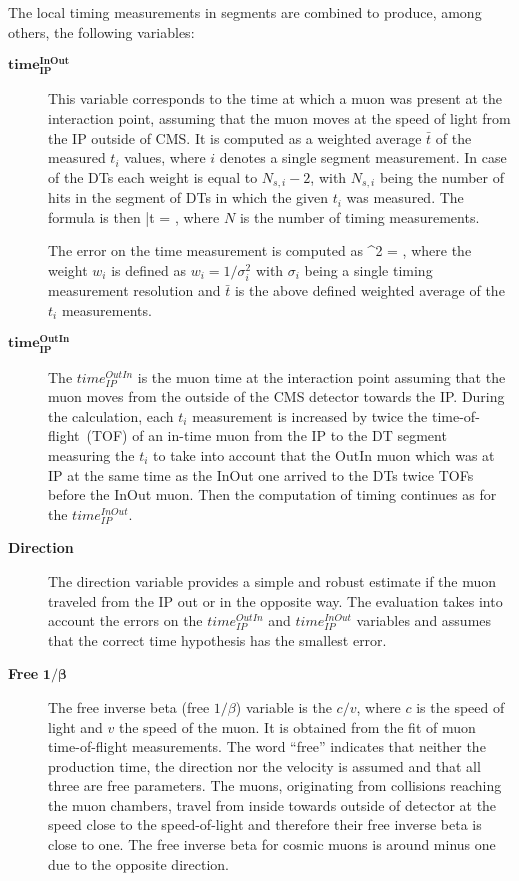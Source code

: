 The local timing measurements in segments are combined to produce, among others, the following variables: 

\begin{description}
\item [$\mathbf{time_{IP}^{InOut}}$]
This variable corresponds to the time at which a muon was present at the interaction point, assuming that the muon moves at the speed of light from the IP outside of CMS. It is computed as a weighted average $\bar{t}$ of the measured $t_{i}$ values, where $i$ denotes a single segment measurement. In case of the DTs each weight is equal to $N_{s,i}-2$, with $N_{s,i}$ being the number of hits in the segment of DTs in which the given $t_{i}$ was measured. The formula is then
{
 \bar{t} =  \times {} \times {},
}
where $N$ is the number of timing measurements.

The error on the time measurement is computed as
{
 \sigma^{2} =  \times {} \times {},
}
where the weight $w_{i}$ is defined as $w_i = 1/\sigma_{i}^2$ with $\sigma_{i}$ being a single timing measurement resolution and $\bar{t}$ is the above defined weighted average of the $t_{i}$ measurements.

\item[$\mathbf{time_{IP}^{OutIn}}$ ]
The $time_{IP}^{OutIn}$ is the muon time at the interaction point assuming that the muon moves from the outside of the CMS detector towards the IP. During the calculation, each $t_{i}$ measurement is increased by twice the time-of-flight~(TOF) of an in-time muon from the IP to the DT segment measuring the $t_{i}$ to take into account that the OutIn muon which was at IP at the same time as the InOut one arrived to the DTs twice TOFs before the InOut muon. Then the computation of timing continues as for the $time_{IP}^{InOut}$.

\item[\textbf{Direction}]
The direction variable provides a simple and robust estimate if the muon traveled from the IP out or in the opposite way. The evaluation takes into account the errors on the $time_{IP}^{OutIn}$ and $time_{IP}^{InOut}$ variables and assumes that the correct time hypothesis has the smallest error.

\item[\textbf{Free} $\mathbf{1/\beta}$]
The free inverse beta (free $1/\beta$) variable is the $c/v$, where $c$ is the speed of light and $v$ the speed of the muon.  It is obtained from the fit of muon time-of-flight measurements. The word ``free'' indicates that neither the production time, the direction nor the velocity is assumed and that all three are free parameters. The muons, originating from collisions reaching the muon chambers, travel from inside towards outside of detector at the speed close to the speed-of-light and therefore their free inverse beta is close to one. The free inverse beta for cosmic muons is around minus one due to the opposite direction.


\end{description}
